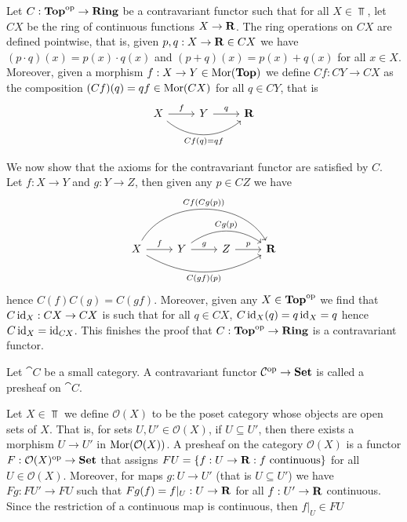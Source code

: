 \begin{example}[\(\Top^\op \to \Rng\)]
Let \(C: {\textbf{Top}}^{\mathrm{op}} \to {\textbf{Ring}}\) be a contravariant functor such that
for all \(X \in \Top\), let \(C X\) be the ring of continuous functions
\(X \to \mathbf{R}\). The ring operations on \(C X\) are defined pointwise,
that is, given \(p, q: X \to \mathbf{R} \in C X\) we have \((p \cdot q) (x) =
p(x) \cdot q(x)\) and \((p + q)(x) = p(x) + q(x)\) for all \(x \in X\).
Moreover, given a morphism \(f: X \to Y \in \operatorname{Mor}({\textbf{Top}})\) we define \(C f:
C Y \to C X\) as the composition \((C f)(q) = q f \in \operatorname{Mor}(C X)\) for all \(q
\in C Y\), that is
\[
  \begin{tikzcd}
    X \ar[r, "f"] \ar[rr, bend right = 40, swap, "C f(q) = q f"]
    & Y \ar[r, "q"] & \R
  \end{tikzcd}
\]

We now show that the axioms for the contravariant functor are satisfied by
\(C\). Let \(f: X \to Y\) and \(g: Y \to Z\), then given any \(p \in C Z\) we
have
\[
  \begin{tikzcd}
    X \ar[r, "f"]
    \ar[rrr, bend left = 60, "C f(C g (p))"]
    \ar[rrr, bend right, swap, "C (g f)(p)"]
    & Y \ar[r, "g"]
    \ar[rr, bend left = 35, "C g(p)"]
    & Z \ar[r, "p"] & \R
  \end{tikzcd}
\]
hence \(C (f) C (g) = C (g f)\). Moreover, given any \(X \in {\textbf{Top}}^{\mathrm{op}}\)
we find that \(C \operatorname{id}_X: C X \to C X\) is such that for all \(q \in C X\), \(C
\operatorname{id}_X (q) = q \operatorname{id}_X = q\) hence \(C \operatorname{id}_X = \operatorname{id}_{C X}\). This finishes the
proof that \(C: {\textbf{Top}}^{\mathrm{op}} \to {\textbf{Ring}}\) is a contravariant functor.
\end{example}

\begin{definition}[Presheaf]\label{def: presheaf}
Let \(\cat C\) be a small category. A contravariant functor \(\mathcal C^{\mathrm{op}} \to
{\textbf{Set}}\) is called a presheaf on \(\cat C\).
\end{definition}

\begin{example}
Let \(X \in \Top\) we define \(\mathcal O(X)\) to be the poset category
whose objects are open sets of \(X\). That is, for sets \(U, U' \in \mathcal
O(X)\), if \(U \subseteq U'\), then there exists a morphism \(U \to U'\) in
\(\operatorname{Mor}(\mathcal O(X))\). A presheaf on the category \(\mathcal O(X)\) is a
functor \(F: \mathcal O(X)^{\mathrm{op}} \to {\textbf{Set}}\) that assigns \(F U = \{f: U \to
\mathbf{R}: f \text{ continuous}\}\) for all \(U \in \mathcal O(X)\).
Moreover, for maps \(g: U \to U'\) (that is \(U \subseteq U'\)) we have \(F g:
F U' \to F U\) such that \(F g(f) = f|_U: U \to \mathbf{R}\) for all \(f: U'
\to \mathbf{R}\) continuous. Since the restriction of a continuous map is
continuous, then \(f|_U \in F U\)
\end{example}

